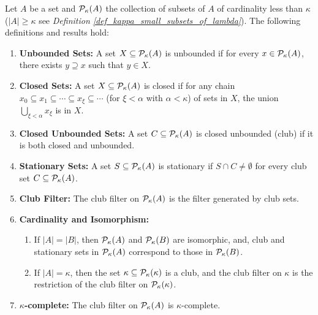 \begin{lemma}\label{lemma_closed_unbounded_stationary}
    Let \( A \) be a set and \( \mathcal{P}_\kappa(A) \) the collection of subsets of \( A \) of cardinality less than \( \kappa \) ($|A| \geq \kappa$ see \textit{Definition \ref{def_kappa_small_subsets_of_lambda}}). The following definitions and results hold:
    
    \begin{enumerate}
        \item \textbf{Unbounded Sets:} A set \( X \subseteq \mathcal{P}_\kappa(A) \) is unbounded if for every \( x \in \mathcal{P}_\kappa(A) \), there exists \( y \supseteq x \) such that \( y \in X \).
        
        \item \textbf{Closed Sets:} A set \( X \subseteq \mathcal{P}_\kappa(A) \) is closed if for any chain \( x_0 \subseteq x_1 \subseteq \cdots \subseteq x_\xi \subseteq \cdots \) (for \( \xi < \alpha \) with \( \alpha < \kappa \)) of sets in \( X \), the union \( \bigcup_{\xi < \alpha} x_\xi \) is in \( X \).
        
        \item \textbf{Closed Unbounded Sets:} A set \( C \subseteq \mathcal{P}_\kappa(A) \) is closed unbounded (club) if it is both closed and unbounded.
        
        \item \textbf{Stationary Sets:} A set \( S \subseteq \mathcal{P}_\kappa(A) \) is stationary if \( S \cap C \neq \emptyset \) for every club set \( C \subseteq \mathcal{P}_\kappa(A) \).
        
        \item \textbf{Club Filter:} The club filter on \( \mathcal{P}_\kappa(A) \) is the filter generated by club sets.
        
        \item \textbf{Cardinality and Isomorphism:}
        \begin{enumerate}
            \item If \( |A| = |B| \), then \( \mathcal{P}_\kappa(A) \) and \( \mathcal{P}_\kappa(B) \) are isomorphic, and, club and stationary sets in \( \mathcal{P}_\kappa(A) \) correspond to those in \( \mathcal{P}_\kappa(B) \).
            \item If \( |A| = \kappa \), then the set \( \kappa \subseteq \mathcal{P}_\kappa(\kappa) \) is a club, and the club filter on \( \kappa \) is the restriction of the club filter on \( \mathcal{P}_\kappa(\kappa) \).
        \end{enumerate}

        \item \textbf{\( \kappa \)-complete:} The club filter on \( \mathcal{P}_\kappa(A) \) is \( \kappa \)-complete.
    \end{enumerate}
\end{lemma}

